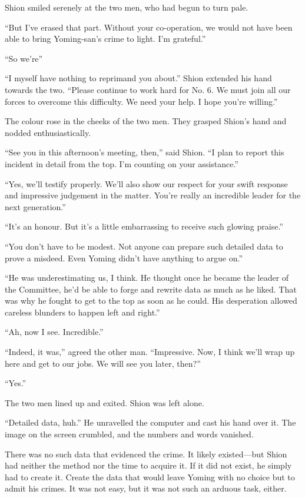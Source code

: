 Shion smiled serenely at the two men, who had begun to turn pale.

``But I've erased that part. Without your co-operation, we would not
have been able to bring Yoming-san's crime to light. I'm grateful.''

``So we're\el ''

``I myself have nothing to reprimand you about.'' Shion extended his
hand towards the two. ``Please continue to work hard for No. 6. We must
join all our forces to overcome this difficulty. We need your help. I
hope you're willing.''

The colour rose in the cheeks of the two men. They grasped Shion's hand
and nodded enthusiastically.

``See you in this afternoon's meeting, then,'' said Shion. ``I plan to
report this incident in detail from the top. I'm counting on your
assistance.''

``Yes, we'll testify properly. We'll also show our respect for your
swift response and impressive judgement in the matter. You're really an
incredible leader for the next generation.''

``It's an honour. But it's a little embarrassing to receive such glowing
praise.''

``You don't have to be modest. Not anyone can prepare such detailed data
to prove a misdeed. Even Yoming didn't have anything to argue on.''

``He was underestimating us, I think. He thought once he became the
leader of the Committee, he'd be able to forge and rewrite data as much
as he liked. That was why he fought to get to the top as soon as he
could. His desperation allowed careless blunders to happen left and
right.''

``Ah, now I see. Incredible.''

``Indeed, it was,'' agreed the other man. ``Impressive. Now, I think
we'll wrap up here and get to our jobs. We will see you later, then?''

``Yes.''

The two men lined up and exited. Shion was left alone.

``Detailed data, huh.'' He unravelled the computer and cast his hand
over it. The image on the screen crumbled, and the numbers and words
vanished.

There was no such data that evidenced the crime. It likely existed---but
Shion had neither the method nor the time to acquire it. If it did not
exist, he simply had to create it. Create the data that would leave
Yoming with no choice but to admit his crimes. It was not easy, but it
was not such an arduous task, either.

